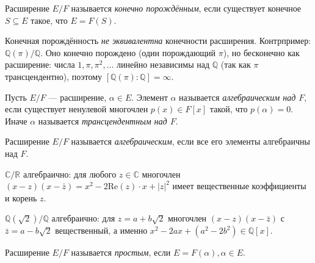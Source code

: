 \begin{definition}
    Расширение $E / F$ называется \emph{конечно порождённым}, если существует конечное
    $S \subseteq E$ такое, что $E = F(S)$.
\end{definition}

\begin{remark}
    Конечная порождённость \emph{не эквивалентна} конечности расширения. Контрпример: $\mathbb{Q}(\pi) / \mathbb{Q}$.
    Оно конечно порождено (один порождающий $\pi$), но бесконечно как расширение:
    числа $1, \pi, \pi^2, \ldots$ линейно независимы над $\mathbb{Q}$ (так как $\pi$ трансцендентно),
    поэтому $[\mathbb{Q}(\pi) : \mathbb{Q}] = \infty$.
\end{remark}

\begin{definition}
    Пусть $E / F$ --- расширение, $\alpha \in E$. Элемент $\alpha$ называется \emph{алгебраическим
    над $F$}, если существует ненулевой многочлен $p(x) \in F[x]$ такой, что $p(\alpha) = 0$.
    Иначе $\alpha$ называется \emph{трансцендентным над $F$}.

\end{definition}

\begin{definition}
    Расширение $E / F$ называется \emph{алгебраическим}, если все его элементы алгебраичны над $F$.
\end{definition}

\begin{examplelist}
    \item $\mathbb{C} / \mathbb{R}$ алгебраично: для любого $z \in \mathbb{C}$
    многочлен $(x - z)(x - \bar{z}) = x^2 - 2\mathrm{Re}(z)\cdot x + |z|^2$ имеет вещественные коэффициенты и корень $z$.
    \item $\mathbb{Q}(\sqrt{2}) / \mathbb{Q}$ алгебраично: для $z = a + b\sqrt{2}$
    многочлен $(x - z)(x - \bar{z})$ с $\bar{z} = a - b\sqrt{2}$ вещественный, а именно
    $x^2 - 2ax + (a^2 - 2b^2) \in \mathbb{Q}[x]$.
\end{examplelist}


\begin{definition}
    Расширение $E / F$ называется \emph{простым}, если $E = F(\alpha), \alpha \in E$.
\end{definition}

